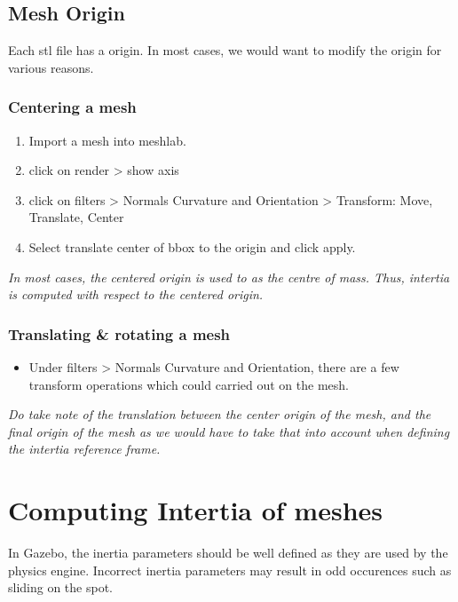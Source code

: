 \documentclass[11pt]{article}
\begin{document}
\subsection{Mesh Origin}
Each stl file has a origin. In most cases, we would want to modify the origin for various reasons.

\subsubsection{Centering a mesh}
\begin{enumerate}
 \item {
       Import a mesh into meshlab.
       }
 \item{
       click on render > show axis
       }
 \item{
       click on filters > Normals Curvature and Orientation > Transform: Move, Translate, Center
       }
 \item{
       Select translate center of bbox to the origin and click apply.
       
       }
       
\end{enumerate}
\emph{In most cases, the centered origin is used to as the centre of mass. Thus, intertia is computed with respect to the centered origin.}
\subsubsection{Translating \& rotating a mesh}
\begin{itemize}
 \item {
       Under filters > Normals Curvature and Orientation, there are a few transform operations which could carried out on the mesh.
       }
\end{itemize}

\emph{Do take note of the translation between the center origin of the mesh, and the final origin of the mesh as we would have to take that into account when defining the intertia reference frame.}
\section{Computing Intertia of meshes}
In Gazebo, the inertia parameters should be well defined as they are used by the physics engine.
Incorrect inertia parameters may result in odd occurences such as sliding on the spot.
\end{document}
